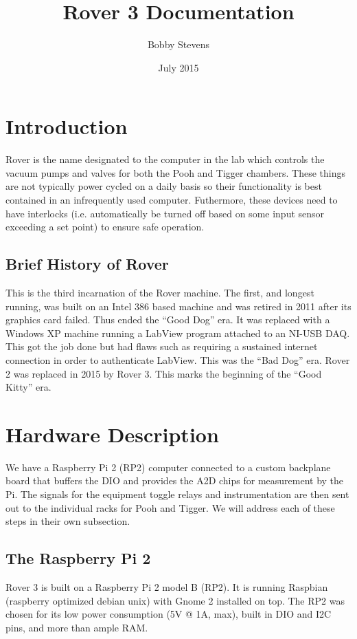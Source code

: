 \documentclass{article}
\title{Rover 3 Documentation}
\author{Bobby Stevens}
\date{July 2015}
\begin{document}
\maketitle


\section{Introduction}
Rover is the name designated to the computer in the lab which controls the vacuum pumps and valves for both the Pooh and Tigger chambers. These things are not typically power cycled on a daily basis so their functionality is best contained in an infrequently used computer. Futhermore, these devices need to have interlocks (i.e. automatically be turned off based on some input sensor exceeding a set point) to ensure safe operation.

\subsection{Brief History of Rover}
This is the third incarnation of the Rover machine. The first, and longest running, was built on an Intel 386 based machine and was retired in 2011 after its graphics card failed. Thus ended the ``Good Dog'' era. It was replaced with a Windows XP machine running a LabView program attached to an NI-USB DAQ. This got the job done but had flaws such as requiring a sustained internet connection in order to authenticate LabView. This was the ``Bad Dog'' era. Rover 2 was replaced in 2015 by Rover 3. This marks the beginning of the ``Good Kitty'' era.


\section{Hardware Description}
We have a Raspberry Pi 2 (RP2) computer connected to a custom backplane board that buffers the DIO and provides the A2D chips for measurement by the Pi. The signals for the equipment toggle relays and instrumentation are then sent out to the individual racks for Pooh and Tigger. We will address each of these steps in their own subsection.

\subsection{The Raspberry Pi 2}
Rover 3 is built on a Raspberry Pi 2 model B (RP2). It is running Raspbian (raspberry optimized debian unix) with Gnome 2 installed on top. The RP2 was chosen for its low power consumption (5V @ 1A, max), built in DIO and I2C pins, and more than ample RAM.
\end{document}
